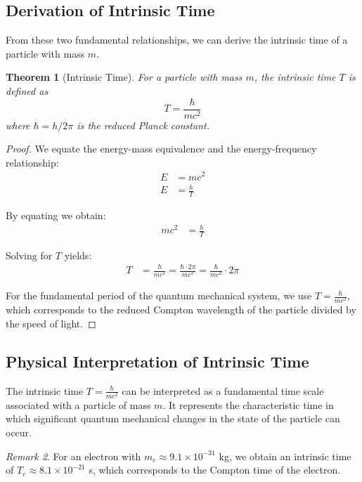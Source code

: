 \documentclass{article}
\newtheorem{theorem}{Theorem}[section]
\theoremstyle{definition}
\theoremstyle{remark}
\newtheorem{remark}[theorem]{Remark}
\begin{document}
	\subsection{Derivation of Intrinsic Time}
	
	From these two fundamental relationships, we can derive the intrinsic time of a particle with mass $m$.
	
	\begin{theorem}[Intrinsic Time]
		For a particle with mass $m$, the intrinsic time $T$ is defined as
		\begin{equation}
			T = \frac{\hbar}{mc^2}
		\end{equation}
		where $\hbar = h/2\pi$ is the reduced Planck constant.
	\end{theorem}
	
	\begin{proof}
		We equate the energy-mass equivalence and the energy-frequency relationship:
		\begin{align}
			E &= mc^2 \\
			E &= \frac{h}{T}
		\end{align}
		
		By equating we obtain:
		\begin{align}
			mc^2 &= \frac{h}{T} 
		\end{align}
		
		Solving for $T$ yields:
		\begin{align}
			T &= \frac{h}{mc^2} = \frac{\hbar \cdot 2\pi}{mc^2} = \frac{\hbar}{mc^2} \cdot 2\pi
		\end{align}
		
		For the fundamental period of the quantum mechanical system, we use $T = \frac{\hbar}{mc^2}$, which corresponds to the reduced Compton wavelength of the particle divided by the speed of light.
	\end{proof}
	
	\subsection{Physical Interpretation of Intrinsic Time}
	
	The intrinsic time $T = \frac{\hbar}{mc^2}$ can be interpreted as a fundamental time scale associated with a particle of mass $m$. It represents the characteristic time in which significant quantum mechanical changes in the state of the particle can occur.
	
	\begin{remark}
		For an electron with $m_e \approx 9.1 \times 10^{-31}$ kg, we obtain an intrinsic time of $T_e \approx 8.1 \times 10^{-21}$ s, which corresponds to the Compton time of the electron.
	\end{remark}
	
\end{document}
